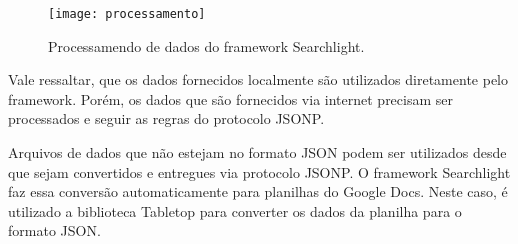 	\begin{figure}[htb]
	\caption{\label{fig-processamento}Processamendo de dados do framework Searchlight.}
	\begin{center}
	    \texttt{[image: processamento]}
	\end{center}
\end{figure}
	
	Vale ressaltar, que os dados fornecidos localmente são utilizados diretamente pelo framework. Porém,  os dados que são fornecidos via internet precisam ser processados e seguir as regras do protocolo JSONP. 
	
	Arquivos de dados que não estejam no formato JSON podem ser utilizados desde que sejam convertidos e entregues via protocolo JSONP. O framework Searchlight faz essa conversão automaticamente para planilhas do Google Docs. Neste caso, é utilizado a biblioteca Tabletop para converter os dados da planilha para o formato JSON.
	
	
	 
	 
		 
		
